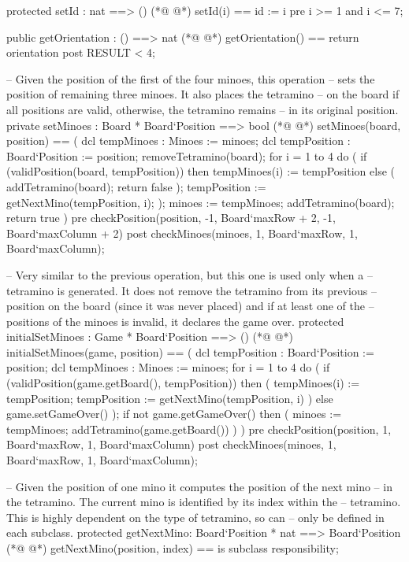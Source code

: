 \begin{vdmpp}[breaklines=true]
  protected setId : nat ==> ()
(*@
\label{setId:62}
@*)
  setId(i) == id := i
  pre i >= 1 and i <= 7;
  
  public getOrientation : () ==> nat
(*@
\label{getOrientation:66}
@*)
  getOrientation() == return orientation
  post RESULT < 4;

  -- Given the position of the first of the four minoes, this operation
  -- sets the position of remaining three minoes. It also places the tetramino
  -- on the board if all positions are valid, otherwise, the tetramino remains
  -- in its original position.
  private setMinoes : Board * Board`Position ==> bool
(*@
\label{setMinoes:74}
@*)
  setMinoes(board, position) == (
   dcl tempMinoes : Minoes := minoes;
   dcl tempPosition : Board`Position := position;
   removeTetramino(board);
   for i = 1 to 4 do (
    if (validPosition(board, tempPosition)) 
    then tempMinoes(i) := tempPosition
    else (
     addTetramino(board);
     return false
    );
    tempPosition := getNextMino(tempPosition, i);
   );    
   minoes := tempMinoes;
   addTetramino(board);
   return true
  )
  pre checkPosition(position, -1, Board`maxRow + 2, -1, Board`maxColumn + 2)
  post checkMinoes(minoes, 1, Board`maxRow, 1, Board`maxColumn);
  
  -- Very similar to the previous operation, but this one is used only when a 
  -- tetramino is generated. It does not remove the tetramino from its previous
  -- position on the board (since it was never placed) and if at least one of the
  -- positions of the minoes is invalid, it declares the game over.
  protected initialSetMinoes : Game * Board`Position ==> ()
(*@
\label{initialSetMinoes:99}
@*)
  initialSetMinoes(game, position) == (
   dcl tempPosition : Board`Position := position;
   dcl tempMinoes : Minoes := minoes;
   for i = 1 to 4 do (
    if (validPosition(game.getBoard(), tempPosition)) 
    then (
     tempMinoes(i) := tempPosition;
     tempPosition := getNextMino(tempPosition, i)
    ) 
    else game.setGameOver()
   );   
   if not game.getGameOver() then (
    minoes := tempMinoes;
    addTetramino(game.getBoard())
   )
  )
  pre checkPosition(position, 1, Board`maxRow, 1, Board`maxColumn)
  post checkMinoes(minoes, 1, Board`maxRow, 1, Board`maxColumn);
  
  -- Given the position of one mino it computes the position of the next mino
  -- in the tetramino. The current mino is identified by its index within the
  -- tetramino. This is highly dependent on the type of tetramino, so can 
  -- only be defined in each subclass.
  protected getNextMino: Board`Position * nat ==> Board`Position
(*@
\label{getNextMino:123}
@*)
  getNextMino(position, index) ==
   is subclass responsibility;
   

\end{vdmpp}
